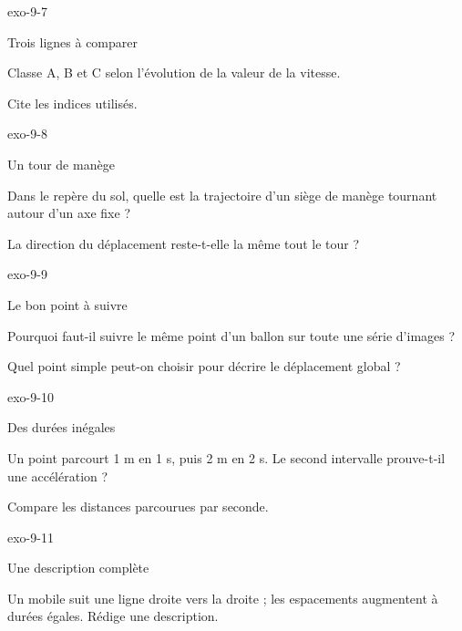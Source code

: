 \documentclass[12pt,twoside,openany]{book}
\begin{document}
\begin{blocLivre}{exo-9-7}
\begin{exercice}[2]{Trois lignes à comparer}
\begin{questions}
\item Classe A, B et C selon l’évolution de la valeur de la vitesse.
\item Cite les indices utilisés.
\end{questions}
\end{exercice}\end{blocLivre}
\begin{blocLivre}{exo-9-8}
\begin{exercice}[2]{Un tour de manège}
\begin{questions}
\item Dans le repère du sol, quelle est la trajectoire d’un siège de manège tournant autour d’un axe fixe ?
\item La direction du déplacement reste-t-elle la même tout le tour ?
\end{questions}
\end{exercice}\end{blocLivre}
\begin{blocLivre}{exo-9-9}
\begin{exercice}[2]{Le bon point à suivre}
\begin{questions}
\item Pourquoi faut-il suivre le même point d’un ballon sur toute une série d’images ?
\item Quel point simple peut-on choisir pour décrire le déplacement global ?
\end{questions}
\end{exercice}\end{blocLivre}
\begin{blocLivre}{exo-9-10}
\begin{exercice}[2]{Des durées inégales}
\begin{questions}
\item Un point parcourt 1 m en 1 s, puis 2 m en 2 s. Le second intervalle prouve-t-il une accélération ?
\item Compare les distances parcourues par seconde.
\end{questions}
\end{exercice}\end{blocLivre}
\begin{blocLivre}{exo-9-11}
\begin{exercice}[2]{Une description complète}
\begin{questions}
\item Un mobile suit une ligne droite vers la droite ; les espacements augmentent à durées égales. Rédige une description.
\end{questions}
\end{exercice}\end{blocLivre}
\end{document}
